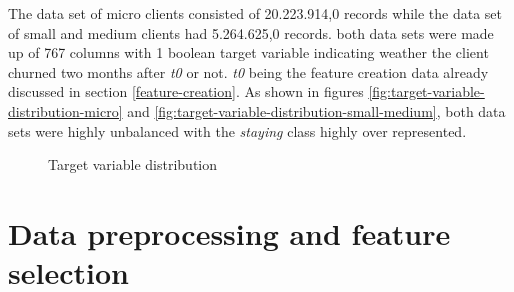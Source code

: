 \documentclass[LaM,binding=0.6cm, english]{sapthesis}
\begin{document}
The data set of micro clients consisted of 20.223.914,0 records while the data set of small and medium clients had 5.264.625,0 records. both data sets were made up of 767 columns with 1 boolean target variable indicating weather the client churned two months after \textit{t0} or not. \textit{t0} being the feature creation data already discussed in section \ref{feature-creation}. As shown in figures \ref{fig:target-variable-distribution-micro} and \ref{fig:target-variable-distribution-small-medium}, both data sets were highly unbalanced with the \textit{staying} class highly over represented.

\begin{figure}[!ht]
  \centering
  \hfill
  \caption{Target variable distribution}
\end{figure}

\section{Data preprocessing and feature selection}
\end{document}

